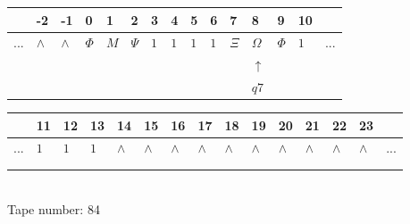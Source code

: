 \documentclass[11pt]{article}
\begin{document}
\begin{table}[H]
\centering
\begin{tabular}{lllllllllllllll}
 & -2 & -1 & 0 & 1 & 2 & 3 & 4 & 5 & 6 & 7 & 8 & 9 & 10 & \\
\hline
$...$ & \multicolumn{1}{|l|}{$\wedge$} & \multicolumn{1}{|l|}{$\wedge$} & \multicolumn{1}{|l|}{$\Phi$} & \multicolumn{1}{|l|}{$M$} & \multicolumn{1}{|l|}{$\Psi$} & \multicolumn{1}{|l|}{$1$} & \multicolumn{1}{|l|}{$1$} & \multicolumn{1}{|l|}{$1$} & \multicolumn{1}{|l|}{$1$} & \multicolumn{1}{|l|}{$\Xi$} & \multicolumn{1}{|l|}{$\Omega$} & \multicolumn{1}{|l|}{$\Phi$} & \multicolumn{1}{|l|}{$1$} & $...$\\
\hline
&  &  &  &  &  &  &  &  &  &  & $\uparrow$ &  &  &  \\
&  &  &  &  &  &  &  &  &  &  & $ q7 $ &  &  &  \\
\end{tabular}
\begin{tabular}{lllllllllllllll}
 & 11 & 12 & 13 & 14 & 15 & 16 & 17 & 18 & 19 & 20 & 21 & 22 & 23 & \\
\hline
$...$ & \multicolumn{1}{|l|}{$1$} & \multicolumn{1}{|l|}{$1$} & \multicolumn{1}{|l|}{$1$} & \multicolumn{1}{|l|}{$\wedge$} & \multicolumn{1}{|l|}{$\wedge$} & \multicolumn{1}{|l|}{$\wedge$} & \multicolumn{1}{|l|}{$\wedge$} & \multicolumn{1}{|l|}{$\wedge$} & \multicolumn{1}{|l|}{$\wedge$} & \multicolumn{1}{|l|}{$\wedge$} & \multicolumn{1}{|l|}{$\wedge$} & \multicolumn{1}{|l|}{$\wedge$} & \multicolumn{1}{|l|}{$\wedge$} & $...$\\
\hline
&  &  &  &  &  &  &  &  &  &  &  &  &  &  \\
&  &  &  &  &  &  &  &  &  &  &  &  &  &  \\
\end{tabular}
\\
Tape number: 84
\noindent\makebox[\linewidth]{\hdashrule{\textwidth}{1pt}{1pt}}\end{table}
\end{document}
